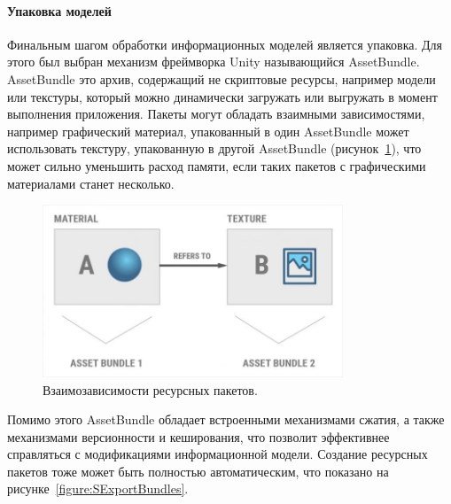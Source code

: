 ﻿\paragraph{Упаковка моделей}

Финальным шагом обработки информационных моделей является упаковка.
Для этого был выбран механизм фреймворка Unity называющийся AssetBundle.
AssetBundle это архив, содержащий не скриптовые ресурсы,
например модели или текстуры, который можно динамически загружать
или выгружать в момент выполнения приложения.
Пакеты могут обладать взаимными зависимостями, например графический материал,
упакованный в один AssetBundle может использовать текстуру,
упакованную в другой AssetBundle (рисунок~\ref{figure:AssetBundleDependency}),
что может сильно уменьшить расход памяти, если таких пакетов
с графическими материалами станет несколько.%
\cite{DocUnity,UnityAssetsResourcesBundles}

\begin{figure}[!htp]
    \centering
    \includegraphics[width=0.8\textwidth]{images/AssetBundleDependency.png}
    \caption{Взаимозависимости ресурсных пакетов.%
    \cite{UnityAssetsResourcesBundles}}
    \label{figure:AssetBundleDependency}
\end{figure}

Помимо этого AssetBundle обладает встроенными механизмами сжатия,
а также механизмами версионности и кеширования,
что позволит эффективнее справляться с модификациями информационной модели.%
\cite{DocUnity,UnityAssetsResourcesBundles}
Создание ресурсных пакетов тоже может быть полностью автоматическим,
что показано на рисунке~\ref{figure:SExportBundles}.


